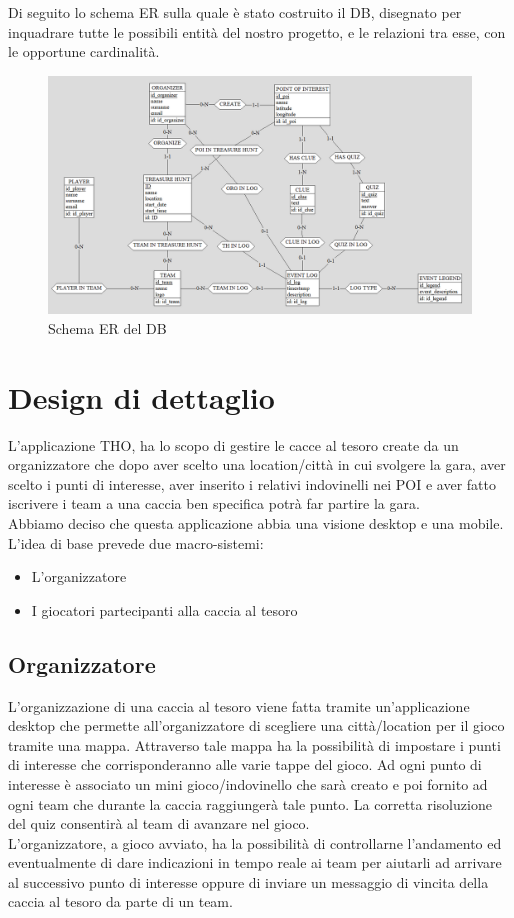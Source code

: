\documentclass[12pt, italian]{article}
\begin{document}
Di seguito lo schema ER sulla quale è stato costruito il DB, disegnato per inquadrare tutte le possibili entità del nostro progetto, e le relazioni tra esse, con le opportune cardinalità. 

\begin{figure}[H]
	\centering
	\includegraphics[width=1\textwidth]{img/ER.png}
	\caption{Schema ER del DB}
\end{figure}

\section{Design di dettaglio}
L'applicazione THO, ha lo scopo di gestire le cacce al tesoro create da un organizzatore che dopo aver scelto una location/città in cui svolgere la gara, aver scelto i punti di interesse, aver inserito i relativi indovinelli nei POI e aver fatto iscrivere i team a una caccia ben specifica potrà far partire la gara.
\\Abbiamo deciso che questa applicazione abbia una visione desktop e una mobile.
L’idea di base prevede due macro-sistemi:
\begin{itemize}
	\item L'organizzatore
	\item I giocatori partecipanti alla caccia al tesoro
\end{itemize}
\subsection{Organizzatore}
L’organizzazione di una caccia al tesoro viene fatta tramite un’applicazione desktop che permette all'organizzatore di scegliere una città/location per il gioco tramite una mappa. Attraverso tale mappa ha la possibilità di impostare i punti di interesse che corrisponderanno alle varie tappe del gioco. Ad ogni punto di interesse è associato un mini gioco/indovinello che sarà creato e poi fornito ad ogni team che durante la caccia raggiungerà tale punto. La corretta risoluzione del quiz consentirà al team di avanzare nel gioco.\\
L'organizzatore, a gioco avviato, ha la possibilità di controllarne l'andamento ed eventualmente di dare indicazioni in tempo reale ai team per aiutarli ad arrivare al successivo punto di interesse oppure di inviare un messaggio di vincita della caccia al tesoro da parte di un team.\\
\end{document}
